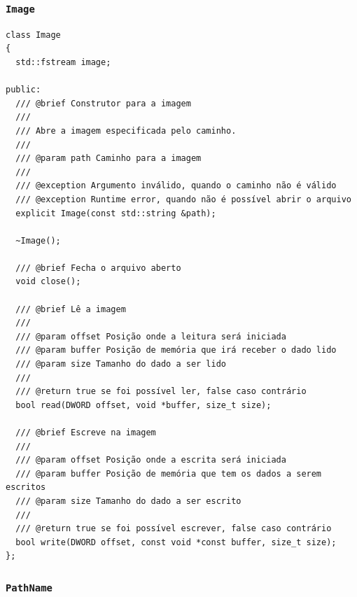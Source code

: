 \documentclass[
    12pt,				%
    oneside,   	        %
    a4paper,			%
    english,			%
    french,				%
    spanish,			%
    brazil,				%
    ]{pacotes/abntex2}
\begin{document}
\subsubsection{\texttt{Image}}
\label{subsubsec:image}

\begin{lstlisting}[caption={Classe para interação do arquivo \texttt{.img} que contém o FAT32 gravado}, label={lst:image}]
class Image
{
  std::fstream image;

public:
  /// @brief Construtor para a imagem
  ///
  /// Abre a imagem especificada pelo caminho.
  ///
  /// @param path Caminho para a imagem
  ///
  /// @exception Argumento inválido, quando o caminho não é válido
  /// @exception Runtime error, quando não é possível abrir o arquivo
  explicit Image(const std::string &path);

  ~Image();

  /// @brief Fecha o arquivo aberto
  void close();

  /// @brief Lê a imagem
  ///
  /// @param offset Posição onde a leitura será iniciada
  /// @param buffer Posição de memória que irá receber o dado lido
  /// @param size Tamanho do dado a ser lido
  ///
  /// @return true se foi possível ler, false caso contrário
  bool read(DWORD offset, void *buffer, size_t size);

  /// @brief Escreve na imagem
  ///
  /// @param offset Posição onde a escrita será iniciada
  /// @param buffer Posição de memória que tem os dados a serem escritos
  /// @param size Tamanho do dado a ser escrito
  ///
  /// @return true se foi possível escrever, false caso contrário
  bool write(DWORD offset, const void *const buffer, size_t size);
};
\end{lstlisting}

\subsubsection{\texttt{PathName}}
\label{subsubsec:path_name}
\end{document}
